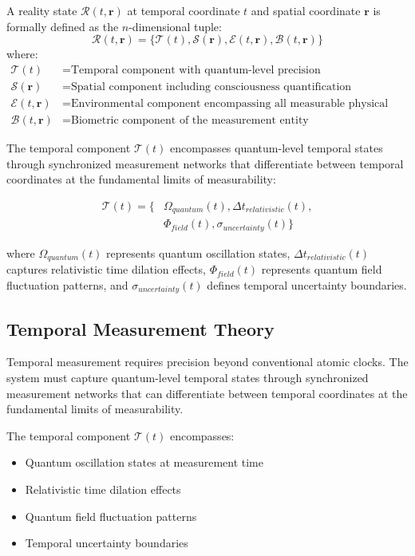 \documentclass[12pt,a4paper]{article}
\begin{document}
A reality state $\mathcal{R}(t,\mathbf{r})$ at temporal coordinate $t$ and spatial coordinate $\mathbf{r}$ is formally defined as the $n$-dimensional tuple:
\begin{equation}
\mathcal{R}(t,\mathbf{r}) = \{\mathcal{T}(t), \mathcal{S}(\mathbf{r}), \mathcal{E}(t,\mathbf{r}), \mathcal{B}(t,\mathbf{r})\}
\end{equation}
where:
\begin{align}
\mathcal{T}(t) &= \text{Temporal component with quantum-level precision} \\
\mathcal{S}(\mathbf{r}) &= \text{Spatial component including consciousness quantification} \\
\mathcal{E}(t,\mathbf{r}) &= \text{Environmental component encompassing all measurable physical conditions} \\
\mathcal{B}(t,\mathbf{r}) &= \text{Biometric component of the measurement entity}
\end{align}

The temporal component $\mathcal{T}(t)$ encompasses quantum-level temporal states through synchronized measurement networks that differentiate between temporal coordinates at the fundamental limits of measurability:

\begin{align}
\mathcal{T}(t) = \{&\Omega_{quantum}(t), \Delta t_{relativistic}(t), \\
&\Phi_{field}(t), \sigma_{uncertainty}(t)\}
\end{align}

where $\Omega_{quantum}(t)$ represents quantum oscillation states, $\Delta t_{relativistic}(t)$ captures relativistic time dilation effects, $\Phi_{field}(t)$ represents quantum field fluctuation patterns, and $\sigma_{uncertainty}(t)$ defines temporal uncertainty boundaries.

\subsection{Temporal Measurement Theory}

Temporal measurement requires precision beyond conventional atomic clocks. The system must capture quantum-level temporal states through synchronized measurement networks that can differentiate between temporal coordinates at the fundamental limits of measurability.

The temporal component $\mathcal{T}(t)$ encompasses:
\begin{itemize}
\item Quantum oscillation states at measurement time
\item Relativistic time dilation effects  
\item Quantum field fluctuation patterns
\item Temporal uncertainty boundaries
\end{itemize}
\end{document}
